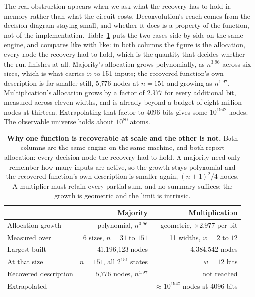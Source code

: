 \documentclass[11pt,a4paper]{article}
\begin{document}
The real obstruction appears when we ask what the recovery has to hold in
memory rather than what the circuit costs. Deconvolution's reach comes from the
decision diagram staying small, and whether it does is a property of the
function, not of the implementation. Table~\ref{tab:growth} puts the two cases
side by side on the same engine, and compares like with like: in both columns
the figure is the allocation, every node the recovery had to hold, which is the
quantity that decides whether the run finishes at all. Majority's allocation
grows polynomially, as $n^{3.96}$ across six sizes, which is what carries it to
151 inputs; the recovered function's own description is far smaller still, 5{,}776
nodes at $n=151$ and growing as $n^{1.97}$. Multiplication's allocation grows by
a factor of $2.977$ for every additional bit, measured across eleven widths,
and is already beyond a budget of eight million nodes at thirteen. Extrapolating
that factor to 4096 bits gives some $10^{1942}$ nodes. The observable universe
holds about $10^{80}$ atoms.

\begin{table}[htbp]
\centering
\caption{\textbf{Why one function is recoverable at scale and the other is
not.} Both columns are the same engine on the same machine, and both report
allocation: every decision node the recovery had to hold. A majority need only
remember how many inputs are active, so the growth stays polynomial and the
recovered function's own description is smaller again, $(n+1)^2/4$ nodes. A
multiplier must retain every partial sum, and no summary suffices; the growth is
geometric and the limit is intrinsic.}\label{tab:growth}
\begin{tabular}{lrr}
\toprule
 & Majority & Multiplication\\\midrule
Allocation growth & polynomial, $n^{3.96}$ & geometric, $\times2.977$ per bit\\
Measured over & 6 sizes, $n=31$ to $151$ & 11 widths, $w=2$ to $12$\\
Largest built & 41{,}196{,}123 nodes & 4{,}384{,}542 nodes\\
At that size & $n=151$, all $2^{151}$ states & $w=12$ bits\\
Recovered description & 5{,}776 nodes, $n^{1.97}$ & not reached\\
Extrapolated & --- & $\approx10^{1942}$ nodes at 4096 bits\\
\bottomrule
\end{tabular}
\end{table}
\end{document}
